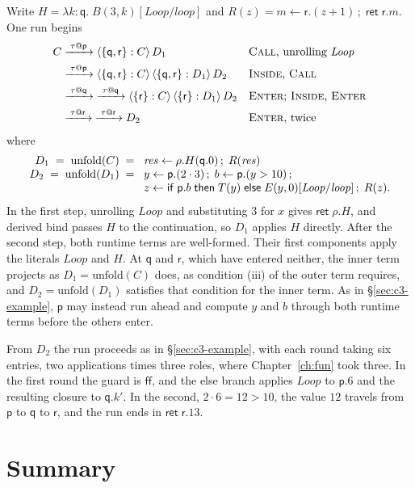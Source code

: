 \documentclass[11pt]{report}
\makeatletter
\theoremstyle{plain}
\theoremstyle{definition}
\theoremstyle{remark}
\newcommand{\kw}[1]{\mathsf{#1}}
\newcommand{\pp}{\mathsf{p}}
\newcommand{\qq}{\mathsf{q}}
\newcommand{\rr}{\mathsf{r}}
\newcommand{\ffalse}{\kw{ff}}
\newcommand{\bind}[3]{#1 \leftarrow #2\,;\;#3}
\newcommand{\cret}[1]{\kw{ret}\;#1}
\newcommand{\cif}[4]{\kw{if}\;#1.#2\;\kw{then}\;#3\;\kw{else}\;#4}
\newcommand{\rt}[3]{\langle #1 : #2\rangle\,#3}
\newcommand{\unfold}[1]{\mathrm{unfold}(#1)}
\newcommand{\tauat}[1]{\tau\mathord{@}#1}
\newcommand{\lto}[1]{\xrightarrow{\;#1\;}}
\newcommand{\clam}[3]{\lambda #1{:}#2.\;#3}
\newcommand{\rn}[1]{{\normalfont\scshape #1}}
\makeatother
\begin{document}
Write $H=\clam{k}{\qq}{B(3,k)[\mathit{Loop}/\mathit{loop}]}$ and
$R(z)=\bind{m}{\rr.(z+1)}{\cret{\rr.m}}$.  One run begins
\begin{align*}
  C &\lto{\tauat{\pp}} \rt{\{\qq,\rr\}}{C}{D_1}
    && \text{\rn{Call}, unrolling } \mathit{Loop}\\
  &\lto{\tauat{\pp}} \rt{\{\qq,\rr\}}{C}{\rt{\{\qq,\rr\}}{D_1}{D_2}}
    && \text{\rn{Inside}, \rn{Call}}\\
  &\lto{\tauat{\qq}}\;\lto{\tauat{\qq}} \rt{\{\rr\}}{C}{\rt{\{\rr\}}{D_1}{D_2}}
    && \text{\rn{Enter}; \rn{Inside}, \rn{Enter}}\\
  &\lto{\tauat{\rr}}\;\lto{\tauat{\rr}} D_2
    && \text{\rn{Enter}, twice}
\end{align*}
where
\[
\begin{array}{r@{\;\;}l}
  D_1 \;=\; \unfold{C} \;=\; & \bind{\mathit{res}}{\rho.H(\qq.0)}{R(\mathit{res})}\\
  D_2 \;=\; \unfold{D_1} \;=\; & \bind{y}{\pp.(2\cdot 3)}{\bind{b}{\pp.(y>10)}{}}\\
    & \bind{z}{\cif{\pp}{b}{T(y)}{E(y,0)[\mathit{Loop}/\mathit{loop}]}}{R(z)}.
\end{array}
\]
In the first step, unrolling $\mathit{Loop}$ and substituting $3$ for $x$
gives $\cret{\rho.H}$, and derived bind passes $H$ to the continuation, so
$D_1$ applies $H$ directly.  After the second step, both runtime terms are
well-formed.  Their first components apply the literals $\mathit{Loop}$ and
$H$.  At $\qq$ and $\rr$, which have entered neither, the inner term
projects as $D_1=\unfold{C}$ does, as condition (iii) of the outer term
requires, and $D_2=\unfold{D_1}$ satisfies that condition for the inner
term.  As in \S\ref{sec:c3-example}, $\pp$ may instead run ahead
and compute $y$ and $b$ through both runtime terms before the others enter.

From $D_2$ the run proceeds as in \S\ref{sec:c3-example}, with each round
taking six entries, two applications times three roles, where
Chapter~\ref{ch:fun} took three.  In the first round the guard is $\ffalse$,
and the else branch applies $\mathit{Loop}$ to $\pp.6$ and the resulting
closure to $\qq.k'$.  In the second, $2\cdot 6=12>10$, the value $12$
travels from $\pp$ to $\qq$ to $\rr$, and the run ends in $\cret{\rr.13}$.

\chapter*{Summary}
\end{document}
